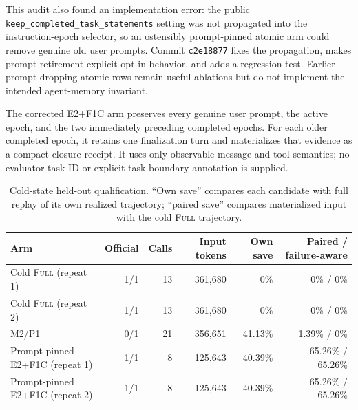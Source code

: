\documentclass[11pt]{article}
\begin{document}
This audit also found an implementation error: the public
\texttt{keep\_completed\_task\_statements} setting was not propagated into the
instruction-epoch selector, so an ostensibly prompt-pinned atomic arm could
remove genuine old user prompts.  Commit \texttt{c2e18877} fixes the propagation,
makes prompt retirement explicit opt-in behavior, and adds a regression test.
Earlier prompt-dropping atomic rows remain useful ablations but do not implement
the intended agent-memory invariant.

The corrected E2+F1C arm preserves every genuine user prompt, the active epoch,
and the two immediately preceding completed epochs.  For each older completed
epoch, it retains one finalization turn and materializes that evidence as a
compact closure receipt.  It uses only observable message and tool semantics;
no evaluator task ID or explicit task-boundary annotation is supplied.

\begin{table}[H]
\centering
\footnotesize
\caption{Cold-state held-out qualification.  ``Own save'' compares each
candidate with full replay of its own realized trajectory; ``paired save''
compares materialized input with the cold \textsc{Full} trajectory.}
\label{tab:heldout-cold-prompt-pinned}
\begin{tabular}{lrrrrr}
\toprule
Arm & Official & Calls & Input tokens & Own save & Paired / failure-aware \\
\midrule
Cold \textsc{Full} (repeat 1) & 1/1 & 13 & 361,680 & 0\% & 0\% / 0\% \\
Cold \textsc{Full} (repeat 2) & 1/1 & 13 & 361,680 & 0\% & 0\% / 0\% \\
M2/P1 & 0/1 & 21 & 356,651 & 41.13\% & 1.39\% / 0\% \\
Prompt-pinned E2+F1C (repeat 1) & 1/1 & 8 & 125,643 & 40.39\% & 65.26\% / 65.26\% \\
Prompt-pinned E2+F1C (repeat 2) & 1/1 & 8 & 125,643 & 40.39\% & 65.26\% / 65.26\% \\
\bottomrule
\end{tabular}
\end{table}
\end{document}
